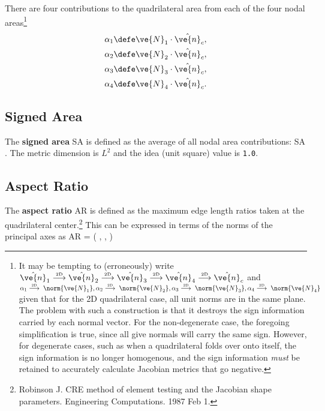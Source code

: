 \documentclass[14pt,letterpaper,fleqn]{extreport}
\begin{document}
There are four contributions to the quadrilateral area from each of the four nodal areas\footnote{It may be tempting to (erroneously) write
 $\hat{\ve{n}}_1 
 \overset{\tiny \mbox{2D}}{\longrightarrow}
 \hat{\ve{n}}_2 
 \overset{\tiny \mbox{2D}}{\longrightarrow}
 \hat{\ve{n}}_3 
 \overset{\tiny \mbox{2D}}{\longrightarrow}
 \hat{\ve{n}}_4
 \overset{\tiny \mbox{2D}}{\longrightarrow}
 \hat{\ve{n}}_c$
and
 $\alpha_1  \overset{\tiny \mbox{2D}}{\longrightarrow} \; \norm{\ve{N}_1}, 
 \alpha_2  \overset{\tiny \mbox{2D}}{\longrightarrow} \; \norm{\ve{N}_2},
 \alpha_3  \overset{\tiny \mbox{2D}}{\longrightarrow} \; \norm{\ve{N}_3},
 \alpha_4  \overset{\tiny \mbox{2D}}{\longrightarrow} \; \norm{\ve{N}_4}$
 given that for the 2D quadrilateral case, all unit norms are in the same plane.
 The problem with such a construction is that it destroys the sign information 
 carried by each normal vector.  
 For the non-degenerate case, the foregoing simplification is true, since all give normals
 will carry the same sign.  However, for degenerate cases, such as when a quadrilateral
 folds over onto itself, 
 the sign information is no longer homogenous, and the sign information
 {\em must} be retained to accurately calculate Jacobian metrics that go negative.
}
\begin{align}
 \alpha_1 & \defe \ve{N}_1 \cdot \hat{\ve{n}}_c, \\
 \alpha_2 & \defe \ve{N}_2 \cdot \hat{\ve{n}}_c, \\
 \alpha_3 & \defe \ve{N}_3 \cdot \hat{\ve{n}}_c, \\
 \alpha_4 & \defe \ve{N}_4 \cdot \hat{\ve{n}}_c.
\end{align}
%

\subsection{Signed Area}
The {\bf signed area} SA is defined as the average of all nodal area contributions:
\be 
\mbox{SA}  \; .
\ee
The metric dimension is $L^2$ and the idea (unit square) value is {\tt 1.0}.

\subsection{Aspect Ratio}

The {\bf aspect ratio} AR is defined as the maximum edge length ratios taken at the 
quadrilateral center.\footnote{Robinson J. CRE method 
of element testing and the Jacobian shape parameters. Engineering Computations. 
1987 Feb 1.}  
This can be expressed in terms of the norms of the principal axes as
\be 
\mbox{AR} = \max\left(
  \frac{\norm{\vX}}{\norm{\vY}}, 
  \frac{\norm{\vY}}{\norm{\vX}}, 
 \right)
\ee
\end{document}
